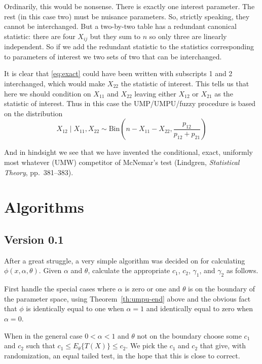 \documentclass{article}
\newcommand{\BinomialDis}{\text{Bin}}
\begin{document}
Ordinarily, this would be nonsense.  There is exactly one interest parameter.
The rest (in this case two) must be nuisance parameters.  So,
strictly speaking, they cannot be interchanged.  But a two-by-two table has
a redundant canonical statistic: there are four $X_{i j}$ but they sum to $n$
so only three are linearly independent.  So if we add the redundant statistic
to the statistics corresponding to parameters of interest we two sets of two
that can be interchanged.

It is clear that \eqref{eq:exact} could have been written with subscripts
1 and 2 interchanged, which would make $X_{2 2}$ the statistic of interest.
This tells us that here we should condition on $X_{1 1}$ and $X_{2 2}$
leaving either $X_{1 2}$ or $X_{2 1}$ as the statistic of interest.
Thus in this case the UMP/UMPU/fuzzy procedure is based on the distribution
$$
   X_{1 2} \mid X_{1 1}, X_{2 2}
   \sim
   \BinomialDis\left(n - X_{1 1} - X_{2 2}, \frac{p_{1 2}}{p_{1 2} + p_{2 1}}
   \right)
$$

And in hindsight we see that we have invented the conditional, exact,
uniformly most whatever (UMW) competitor of McNemar's test (Lindgren,
\emph{Statistical Theory}, pp.~381--383).

\section{Algorithms}

\subsection{Version 0.1}

After a great struggle, a very simple algorithm was decided on for
calculating $\phi(x, \alpha, \theta)$.  Given $\alpha$ and $\theta$,
calculate the appropriate $c_1$, $c_2$, $\gamma_1$, and $\gamma_2$
as follows.

First handle the special cases where $\alpha$ is zero or one
and $\theta$ is on the boundary of the parameter space, using
Theorem~\ref{th:umpu-end} above and the obvious fact that $\phi$ is
identically equal to one when $\alpha = 1$ and identically equal to zero
when $\alpha = 0$.

When in the general case $0 < \alpha < 1$ and $\theta$ not on the boundary
choose some $c_1$ and $c_2$ such that $c_1 \le E_\theta\{T(X)\} \le c_2$.
We pick the $c_1$ and $c_2$ that give, with randomization, an equal tailed
test, in the hope that this is close to correct.
\end{document}
